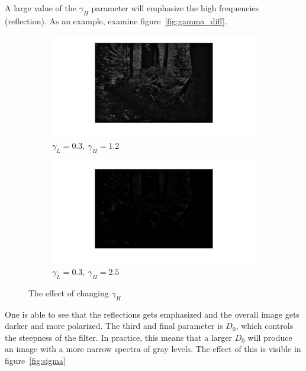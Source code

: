 		A large value of the $\gamma_H$ parameter 
		will emphasize the high frequencies (reflection). As an example, 
		examine figure~\ref{fig:gamma_diff}.
		\begin{figure}[h!]
			\centering
			\begin{subfigure}[b]{0.6\textwidth}
				\includegraphics[width=\textwidth]{pics/non_emph_high_frequnces.png}
				\caption{$\gamma_L = 0.3,~\gamma_H = 1.2$}
				\label{fig:high_freq_non_emph}
			\end{subfigure}%
			\begin{subfigure}[b]{0.6\textwidth}
				\includegraphics[width=\textwidth]{pics/emph_high_frequnces.png}
				\caption{$\gamma_L = 0.3,~\gamma_H = 2.5$}
				\label{fig:high_freq_emph}
			\end{subfigure}
			\label{fig:high_gamma}
		\caption{The effect of changing $\gamma_H$}				
		\end{figure}		
		One is able to see that the reflections gets emphasized and the overall
		image gets darker and more polarized.
		The third and final parameter is $D_0$, which controls the steepness of the filter.
		In practice, this means that a larger $D_0$ will produce an image with a more 
		narrow spectra of gray levels. The effect of this is visible in figure~\ref{fig:sigma}
